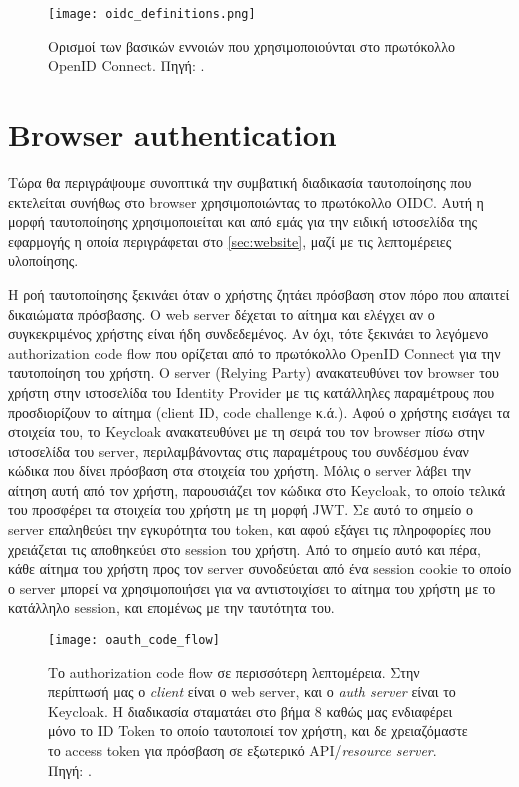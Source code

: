 \documentclass[../thesis.tex]{subfiles}
\begin{document}
\begin{figure}
    \texttt{[image: oidc\_definitions.png]}
    \centering
    \caption{Ορισμοί των βασικών εννοιών που χρησιμοποιούνται στο πρωτόκολλο OpenID Connect. Πηγή: \cite{oidc_faq}.}
\end{figure}

\section{Browser authentication}

Τώρα θα περιγράψουμε συνοπτικά την συμβατική διαδικασία ταυτοποίησης που εκτελείται συνήθως στο browser χρησιμοποιώντας το πρωτόκολλο OIDC.
Αυτή η μορφή ταυτοποίησης χρησιμοποιείται και από εμάς για την ειδική ιστοσελίδα της εφαρμογής η οποία περιγράφεται στο \autoref{sec:website}, μαζί με τις λεπτομέρειες υλοποίησης.

Η ροή ταυτοποίησης ξεκινάει όταν ο χρήστης ζητάει πρόσβαση στον πόρο που απαιτεί δικαιώματα πρόσβασης.
Ο web server δέχεται το αίτημα και ελέγχει αν ο συγκεκριμένος χρήστης είναι ήδη συνδεδεμένος.
Αν όχι, τότε ξεκινάει το λεγόμενο authorization code flow που ορίζεται από το πρωτόκολλο OpenID Connect για την ταυτοποίηση του χρήστη.
Ο server (Relying Party) ανακατευθύνει τον browser του χρήστη στην ιστοσελίδα του Identity Provider με τις κατάλληλες παραμέτρους που προσδιορίζουν το αίτημα (client ID, code challenge κ.ά.).
Αφού ο χρήστης εισάγει τα στοιχεία του, το Keycloak ανακατευθύνει με τη σειρά του τον browser πίσω στην ιστοσελίδα του server, περιλαμβάνοντας στις παραμέτρους του συνδέσμου έναν κώδικα που δίνει πρόσβαση στα στοιχεία του χρήστη.
Μόλις ο server λάβει την αίτηση αυτή από τον χρήστη, παρουσιάζει τον κώδικα στο Keycloak, το οποίο τελικά του προσφέρει τα στοιχεία του χρήστη με τη μορφή JWT.
Σε αυτό το σημείο ο server επαληθεύει την εγκυρότητα του token, και αφού εξάγει τις πληροφορίες που χρειάζεται τις αποθηκεύει στο session του χρήστη.
Από το σημείο αυτό και πέρα, κάθε αίτημα του χρήστη προς τον server συνοδεύεται από ένα session cookie το οποίο ο server μπορεί να χρησιμοποιήσει για να αντιστοιχίσει το αίτημα του χρήστη με το κατάλληλο session, και επομένως με την ταυτότητα του.

\begin{figure}
    \texttt{[image: oauth\_code\_flow]}
    \centering
    \caption{Το authorization code flow σε περισσότερη λεπτομέρεια. Στην περίπτωσή μας ο \textit{client} είναι ο web server, και ο \textit{auth server} είναι το Keycloak. H διαδικασία σταματάει στο βήμα 8 καθώς μας ενδιαφέρει μόνο το ID Token το οποίο ταυτοποιεί τον χρήστη, και δε χρειαζόμαστε το access token για πρόσβαση σε εξωτερικό API/\textit{resource server}. Πηγή: \cite{okta_code_flow}.}
\end{figure}
\end{document}

